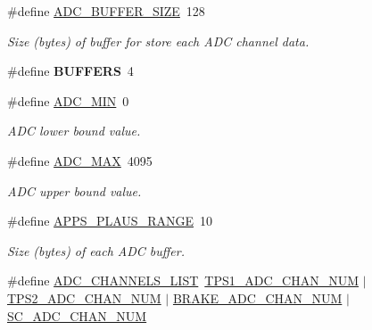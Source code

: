 \begin{DoxyCompactItemize}
\mbox{\label{group___board__model__group_ga602abb8ec84dcb3b6f854a738310ea46}} 
\#define \mbox{\hyperlink{group___board__model__group_ga602abb8ec84dcb3b6f854a738310ea46}{A\+D\+C\+\_\+\+B\+U\+F\+F\+E\+R\+\_\+\+S\+I\+ZE}}~128
\begin{DoxyCompactList}\small\item\em Size (bytes) of buffer for store each A\+DC channel data. \end{DoxyCompactList}\item 
\mbox{\label{group___board__model__group_gaabe0f927d44a09f458bd5fe5ab4e2f7f}} 
\#define {\bfseries B\+U\+F\+F\+E\+RS}~4
\item 
\mbox{\label{group___board__model__group_gaf0098a1eafb8a60a1c65773e1064d595}} 
\#define \mbox{\hyperlink{group___board__model__group_gaf0098a1eafb8a60a1c65773e1064d595}{A\+D\+C\+\_\+\+M\+IN}}~0
\begin{DoxyCompactList}\small\item\em A\+DC lower bound value. \end{DoxyCompactList}\item 
\mbox{\label{group___board__model__group_ga555a695bf58df062dc03f0e892d95cd7}} 
\#define \mbox{\hyperlink{group___board__model__group_ga555a695bf58df062dc03f0e892d95cd7}{A\+D\+C\+\_\+\+M\+AX}}~4095
\begin{DoxyCompactList}\small\item\em A\+DC upper bound value. \end{DoxyCompactList}\item 
\mbox{\label{group___board__model__group_ga3e1022cd2e2154437b583f7ff83f2960}} 
\#define \mbox{\hyperlink{group___board__model__group_ga3e1022cd2e2154437b583f7ff83f2960}{A\+P\+P\+S\+\_\+\+P\+L\+A\+U\+S\+\_\+\+R\+A\+N\+GE}}~10
\begin{DoxyCompactList}\small\item\em Size (bytes) of each A\+DC buffer. \end{DoxyCompactList}\item 
\mbox{\label{group___board__model__group_ga8b6fbd5b46174be3b86bc1ab5daa9080}} 
\#define \mbox{\hyperlink{group___board__model__group_ga8b6fbd5b46174be3b86bc1ab5daa9080}{A\+D\+C\+\_\+\+C\+H\+A\+N\+N\+E\+L\+S\+\_\+\+L\+I\+ST}}~\mbox{\hyperlink{group___board__model__group_ga99b2a7dadaf495e3c559a46440f9141f}{T\+P\+S1\+\_\+\+A\+D\+C\+\_\+\+C\+H\+A\+N\+\_\+\+N\+UM}} $\vert$ \mbox{\hyperlink{group___board__model__group_ga4cecb8c10512873904099a1a88d69ed3}{T\+P\+S2\+\_\+\+A\+D\+C\+\_\+\+C\+H\+A\+N\+\_\+\+N\+UM}} $\vert$ \mbox{\hyperlink{group___board__model__group_ga310547321c4a016c4ad19922920fadfd}{B\+R\+A\+K\+E\+\_\+\+A\+D\+C\+\_\+\+C\+H\+A\+N\+\_\+\+N\+UM}} $\vert$ \mbox{\hyperlink{group___board__model__group_ga564adb575db2620ac85e3abdd6a5bbaf}{S\+C\+\_\+\+A\+D\+C\+\_\+\+C\+H\+A\+N\+\_\+\+N\+UM}}

\end{DoxyCompactItemize}
